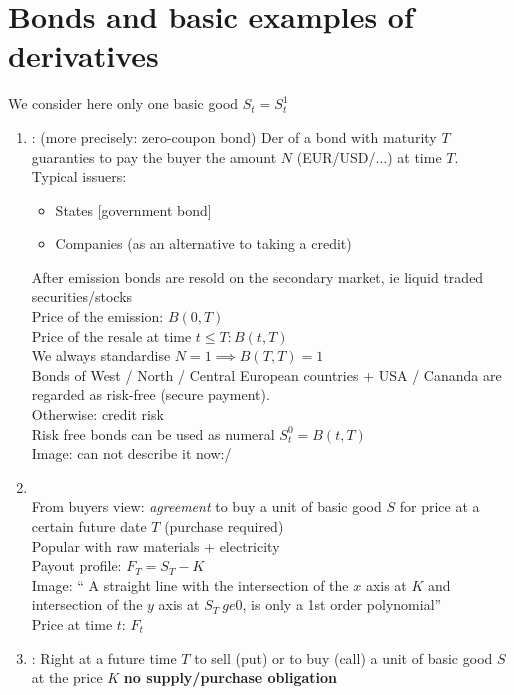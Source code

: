 \section{Bonds and basic examples of derivatives}
We consider here only one basic good $S_t = S^1_t$
\begin{enumerate}
	\item {}: (more precisely: zero-coupon bond) Der  of a bond with maturity $T$ guaranties to pay the buyer the amount $N$ (EUR/USD/...) at time $T$.\\
	Typical issuers:
	\begin{itemize}
		\item States [government bond]
		\item Companies (as an alternative to taking a credit)
	\end{itemize}
    After emission bonds are resold on the secondary market, ie liquid traded securities/stocks\\
	Price of the emission: $B(0,T)$\\
	Price of the resale at time $t \le T\colon B(t,T)$\\
	We always standardise $N=1 \implies B(T,T) =1$\\
	Bonds of West / North / Central European countries + USA / Cananda are regarded as risk-free (secure payment).\\
	Otherwise: credit risk\\
	Risk free bonds can be used as numeral $S^0_t = B(t,T)$\\
	Image: can not describe it now:/ \\
	\item {}\\
	From buyers view: \emph{agreement} to buy a unit of basic good $S$ for price at a certain future date $T$ (purchase required)\\
	Popular with raw materials + electricity \\
	Payout profile: $F_T = S_T - K$\\
    Image: `` A straight line with the intersection of the $x$ axis at $K$ and intersection of the $y$ axis at $S_T \ ge 0$, is only a 1st order polynomial''\\
	Price at time $t$: $F_t$
	\item {}:
	Right at a future time $T$ to sell (put) or to buy (call) a unit of basic good $S$ at the price $K$ \textbf{no supply/purchase obligation}\\
	\begin{itemize}

\end{itemize}
\end{enumerate}
